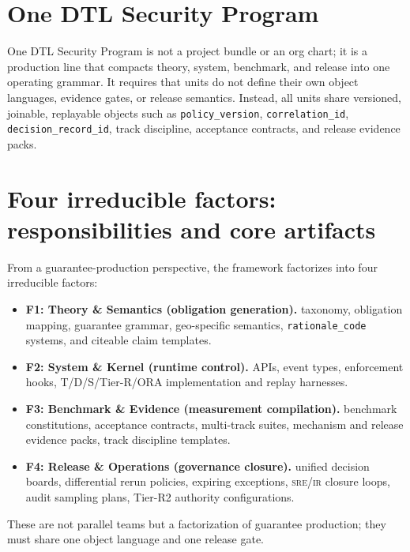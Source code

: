 \documentclass[11pt,a4paper]{report}
\begin{document}
\section{One DTL Security Program}
One DTL Security Program is not a project bundle or an org chart; it is a production line that compacts theory, system, benchmark, and release into one operating grammar. It requires that units do not define their own object languages, evidence gates, or release semantics. Instead, all units share versioned, joinable, replayable objects such as \texttt{policy\_version}, \texttt{correlation\_id}, \texttt{decision\_record\_id}, track discipline, acceptance contracts, and release evidence packs.

\section{Four irreducible factors: responsibilities and core artifacts}
From a guarantee-production perspective, the framework factorizes into four irreducible factors:
\begin{itemize}
  \item \textbf{F1: Theory \& Semantics (obligation generation).} taxonomy, obligation mapping, guarantee grammar, geo-specific semantics, \texttt{rationale\_code} systems, and citeable claim templates.
  \item \textbf{F2: System \& Kernel (runtime control).} \SafetyKernel{} APIs, event types, enforcement hooks, T/D/S/Tier-R/ORA implementation and replay harnesses.
  \item \textbf{F3: Benchmark \& Evidence (measurement compilation).} benchmark constitutions, acceptance contracts, multi-track suites, mechanism and release evidence packs, track discipline templates.
  \item \textbf{F4: Release \& Operations (governance closure).} unified decision boards, differential rerun policies, expiring exceptions, \textsc{sre}/\textsc{ir} closure loops, audit sampling plans, Tier-R2 authority configurations.
\end{itemize}
These are not parallel teams but a factorization of guarantee production; they must share one object language and one release gate.
\end{document}
